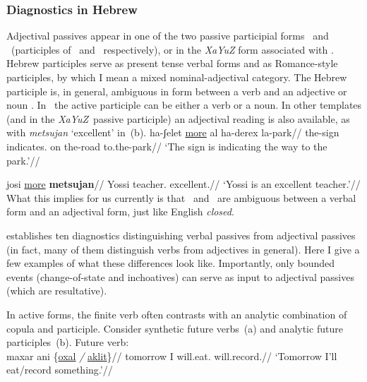 	      \subsubsection{Diagnostics in Hebrew}
Adjectival passives appear in one of the two passive participial forms \mpua~and \mhuf~(participles of \tpua~and \thuf~respectively), or in the \emph{XaYuZ} form associated with \tkal. Hebrew participles serve as present tense verbal forms and as Romance-style participles, by which I mean a mixed nominal-adjectival category. The Hebrew participle is, in general, ambiguous in form between a verb and an adjective or noun \citep{boneh13tense,doron13ehll}. In \tkal~the active participle can be either a verb or a noun. In other templates (and in the \emph{XaYuZ}~passive participle) an adjectival reading is also available, as with \emph{metsujan} `excellent' in~(\nextx b).
\pex
	\a \begingl
		\gla ha-ʃelet \underline{more} al ha-derex la-park//
		\glb the-sign indicates. on the-road to.the-park//
		\glft `The sign is indicating the way to the park.'//
	\endgl
	
	\a \begingl
		\gla josi \underline{more} \textbf{metsujan}//
		\glb Yossi teacher. excellent.//
		\glft `Yossi is an excellent teacher.'//
	\endgl
\xe
What this implies for us currently is that \mpua~and \mhuf~are ambiguous between a verbal form and an adjectival form, just like English \emph{closed}.

\cite{doron00} establishes ten diagnostics distinguishing verbal passives from adjectival passives (in fact, many of them distinguish verbs from adjectives in general). Here I give a few examples of what these differences look like. Importantly, only bounded events (change-of-state and inchoatives) can serve as input to adjectival passives (which are resultative).

In active forms, the finite verb often contrasts with an analytic combination of copula and participle. Consider synthetic future verbs~(\nextx a) and analytic future participles~(\nextx b).
\pex \label{ex:pres-act}
 \a Future verb:\\
 \begingl
     \gla maxar ani \{\underline{oxal} \emph{/} \underline{aklit}\}//
     \glb tomorrow I will.eat. {} will.record.//
     \glft `Tomorrow I'll eat/record something.'//
 \endgl

